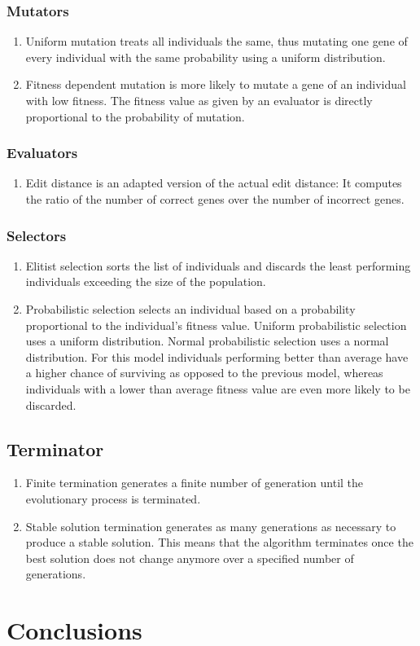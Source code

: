 \documentclass[a4paper,10pt]{article}
\begin{document}
\subsubsection{Mutators}
\begin{enumerate}
 \item Uniform mutation treats all individuals the same, thus mutating one gene of every individual with the same probability using a uniform distribution.
 \item Fitness dependent mutation is more likely to mutate a gene of an individual with low fitness. The fitness value as given by an evaluator is directly proportional to the probability of mutation.
\end{enumerate}

\subsubsection{Evaluators}
\begin{enumerate}
 \item Edit distance is an adapted version of the actual edit distance: It computes the ratio of the number of correct genes over the number of incorrect genes.
\end{enumerate}

\subsubsection{Selectors}
\begin{enumerate}
 \item Elitist selection sorts the list of individuals and discards the least performing individuals exceeding the size of the population.
 \item Probabilistic selection selects an individual based on a probability proportional to the individual's fitness value.
    \subitem Uniform probabilistic selection uses a uniform distribution.
    \subitem Normal probabilistic selection uses a normal distribution. For this model individuals performing better than average have a higher chance of surviving as opposed to the previous model, whereas individuals with a lower than average fitness value are even more likely to be discarded.
\end{enumerate}

\subsection{Terminator}
\begin{enumerate}
 \item Finite termination generates a finite number of generation until the evolutionary process is terminated.
 \item Stable solution termination generates as many generations as necessary to produce a stable solution. This means that the algorithm terminates once the best solution does not change anymore over a specified number of generations.
\end{enumerate}






\section{Conclusions}
\end{document}
